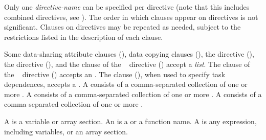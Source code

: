 Only one \emph{directive-name} can be specified per directive (note that this includes combined
directives, see ).  The order in which clauses appear on directives
is not significant. Clauses on directives may be repeated as needed, subject to the
restrictions listed in the description of each clause.

Some data-sharing attribute clauses (),
data copying clauses (), the
 directive (),
the  directive (), and the
 clause of the ~ directive
() accept a \emph{list}. The
 clause of the ~ directive
() accepts an .
The  clause (), when used to specify task dependences,
accepts a .  A  consists of a
comma-separated collection of one or more . A
 consists of a comma-separated collection of one or more
. A  consists of a comma-separated
collection of one or more .

\begin{ccppspecific}
A  is a variable or array section. An  is a  or a function name.  A  is any 
expression, including variables, or an array section.
\end{ccppspecific}

